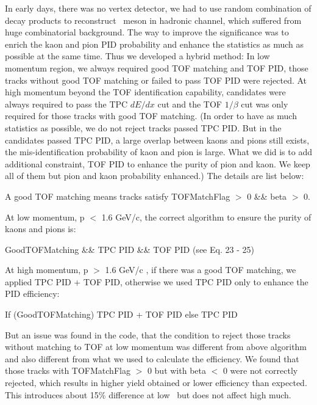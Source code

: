 In early days, there was no vertex detector, we had to use random combination of decay products to reconstruct \dzero\ meson in hadronic channel, which suffered from huge combinatorial background. The way to improve the significance was to enrich the kaon and pion PID probability and enhance the statistics as much as possible at the same time. Thus we developed a hybrid method: In low momentum region, we always required good TOF matching and TOF PID, those tracks without good TOF matching or failed to pass TOF PID were rejected. %
At high momentum beyond the TOF identification capability, candidates were always required to pass the TPC $dE/dx$ cut and the TOF $1/\beta$ cut was only required for those tracks with good TOF matching. (In order to have as much statistics as possible, we do not reject tracks passed TPC PID. But in the candidates passed TPC PID, a large overlap between kaons and pions still exists, the mis-identification probability of kaon and pion is large. What we did is to add additional constraint, TOF PID to enhance the purity of pion and kaon. We keep all of them but pion and kaon probability enhanced.)
The details are list below:

A good TOF matching means tracks satisfy TOFMatchFlag $>$ 0 \&\& beta $>$ 0.

At low momentum, p $<$ 1.6 GeV/c, the correct algorithm to ensure the purity of kaons and pions is:

GoodTOFMatching \&\& TPC PID \&\& TOF PID (see Eq. 23 - 25)

At high momentum, p $>$ 1.6 GeV/c , if there was a good TOF matching, we applied TPC PID + TOF PID, otherwise we used TPC PID only  to enhance the PID efficiency:

If (GoodTOFMatching) TPC PID + TOF PID
else TPC PID

But an issue was found in the code, that the condition to reject those tracks without matching to TOF at low momentum was different from above algorithm and also different from what we used to calculate the efficiency. We found that those tracks with TOFMatchFlag $>$ 0 but with beta $<$ 0 were not correctly rejected, which results in higher yield obtained or lower efficiency than expected. This introduces about 15\% difference at low \pt\ but does not affect high \pt much.

